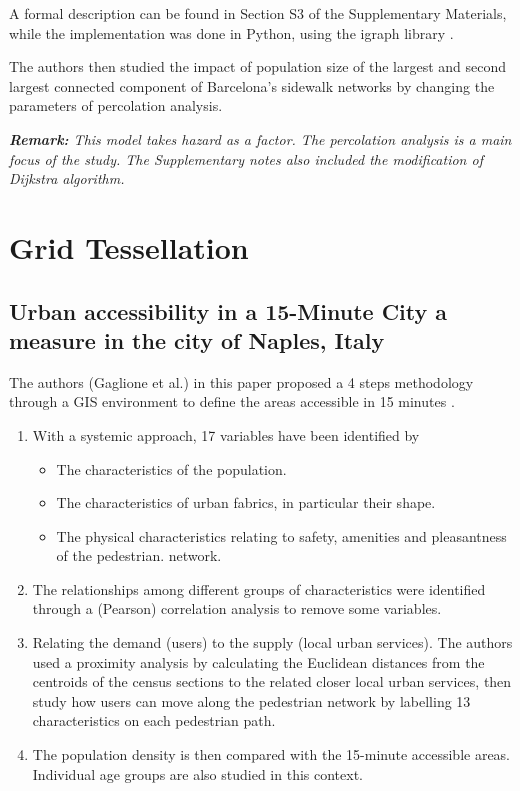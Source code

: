 A formal description can be found in Section S3 of the Supplementary Materials, while the implementation was done in Python, using the {igraph} library \cite{igraph}.

The authors then studied the impact of population size of the largest and second largest connected component of Barcelona's sidewalk networks by changing the parameters of percolation analysis.

\textit{\textbf{Remark:} This model takes hazard as a factor. The percolation analysis is a main focus of the study. The Supplementary notes also included the modification of Dijkstra algorithm.}

\section{Grid Tessellation}

\subsection{Urban accessibility in a 15-Minute City a measure in the city of Naples, Italy} \label{gaglione_urban_2022}

The authors (Gaglione et al.) in this paper proposed a 4 steps methodology through a GIS environment to define the areas accessible in 15 minutes \cite{gaglione_urban_2022}.

\begin{enumerate}
\item With a systemic approach, 17 variables have been identified by
\begin{itemize}
    \item The characteristics of the population.
    \item The characteristics of urban fabrics, in particular their shape.
    \item The physical characteristics relating to safety, amenities and pleasantness of the pedestrian.
    network.
\end{itemize}
\item The relationships among different groups of characteristics were identified through a (Pearson) correlation analysis to remove some variables.
\item Relating the demand (users) to the supply (local urban services). The authors used a proximity analysis by calculating the Euclidean distances from the centroids of the census sections to the related closer local urban services, then study how users can move along the pedestrian network by labelling 13 characteristics on each pedestrian path. 
\item The population density is then compared with the 15-minute accessible areas. Individual age groups are also studied in this context.
\end{enumerate}

